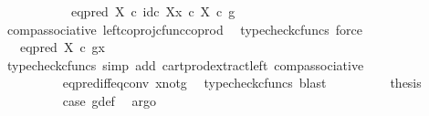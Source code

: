 \begin{isabellebody}
\ \ \ \ \ \ \ \ \ \ {\isacharequal}{\kern0pt}\ {\isacharparenleft}{\kern0pt}eq{\isacharunderscore}{\kern0pt}pred\ X\ {\isasymcirc}\isactrlsub c\ {\isasymlangle}id\isactrlsub c\ X{\isacharcomma}{\kern0pt}x\ {\isasymcirc}\isactrlsub c\ {\isasymbeta}\isactrlbsub X\isactrlesub {\isasymrangle}{\isacharparenright}{\kern0pt}\ {\isasymcirc}\isactrlsub c\ g{\isachardoublequoteclose}\isanewline
\ \ \ \ \ \ \ \ \isamarkupfalse%
\ comp{\isacharunderscore}{\kern0pt}associative{}\ left{\isacharunderscore}{\kern0pt}coproj{\isacharunderscore}{\kern0pt}cfunc{\isacharunderscore}{\kern0pt}coprod\ \isamarkupfalse%
\ {\isacharparenleft}{\kern0pt}typecheck{\isacharunderscore}{\kern0pt}cfuncs{\isacharcomma}{\kern0pt}\ force{\isacharparenright}{\kern0pt}\isanewline
\ \ \ \ \ \ \isamarkupfalse%
\ \isamarkupfalse%
\ {\isachardoublequoteopen}{\isachardot}{\kern0pt}{\isachardot}{\kern0pt}{\isachardot}{\kern0pt}\ {\isacharequal}{\kern0pt}\ eq{\isacharunderscore}{\kern0pt}pred\ X\ {\isasymcirc}\isactrlsub c\ {\isasymlangle}g{\isacharcomma}{\kern0pt}x{\isasymrangle}{\isachardoublequoteclose}\isanewline
\ \ \ \ \ \ \ \ \isamarkupfalse%
\ {\isacharparenleft}{\kern0pt}typecheck{\isacharunderscore}{\kern0pt}cfuncs{\isacharcomma}{\kern0pt}\ simp\ add{\isacharcolon}{\kern0pt}\ cart{\isacharunderscore}{\kern0pt}prod{\isacharunderscore}{\kern0pt}extract{\isacharunderscore}{\kern0pt}left\ comp{\isacharunderscore}{\kern0pt}associative{}{\isacharparenright}{\kern0pt}\isanewline
\ \ \ \ \ \ \isamarkupfalse%
\ \isamarkupfalse%
\ {\isachardoublequoteopen}{\isachardot}{\kern0pt}{\isachardot}{\kern0pt}{\isachardot}{\kern0pt}\ {\isacharequal}{\kern0pt}\ {\isasymf}{\isachardoublequoteclose}\isanewline
\ \ \ \ \ \ \ \ \isamarkupfalse%
\ eq{\isacharunderscore}{\kern0pt}pred{\isacharunderscore}{\kern0pt}iff{\isacharunderscore}{\kern0pt}eq{\isacharunderscore}{\kern0pt}conv\ x{\isacharunderscore}{\kern0pt}not{\isacharunderscore}{\kern0pt}g\ \isamarkupfalse%
\ {\isacharparenleft}{\kern0pt}typecheck{\isacharunderscore}{\kern0pt}cfuncs{\isacharcomma}{\kern0pt}\ blast{\isacharparenright}{\kern0pt}\isanewline
\ \ \ \ \ \ \isamarkupfalse%
\ \isamarkupfalse%
\ {\isacharquery}{\kern0pt}thesis\isanewline
\ \ \ \ \ \ \ \ \isamarkupfalse%
\ case{}\ g{\isacharunderscore}{\kern0pt}def\ \isamarkupfalse%
\ argo\isanewline
\ \ \ \ \isamarkupfalse%
\isanewline

\end{isabellebody}
